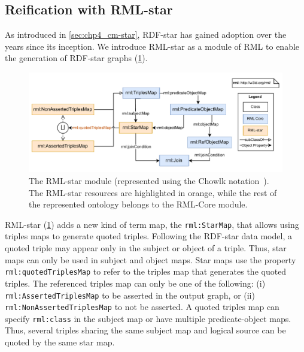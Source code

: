 

\subsection{Reification with RML-star}
\label{sec:chp4_reif_mappings}

As introduced in \cref{sec:chp4_cm-star}, RDF-star has gained adoption over the years since its inception. We introduce RML-star as a module of RML to enable the generation of \mbox{RDF-star} graphs (\cref{fig:chp4-3_rml-star}). 


\begin{figure}[!t]
\centering
\includegraphics[width=1\linewidth]{figures/chp4-3_rml-star_diagram.pdf}
\caption[RML-star module]{The \mbox{RML-star} module (represented using the Chowlk notation~\cite{feria2022chowlk}). The RML-star resources are highlighted in orange, while the rest of the represented ontology belongs to the RML-Core module.}
\label{fig:chp4-3_rml-star}
\end{figure}

\mbox{RML-star} (\cref{fig:chp4-3_rml-star}) adds a new kind of term map, the \texttt{rml:StarMap}, that allows using triples maps to generate quoted triples. 
Following the \mbox{RDF-star} data model,
a quoted triple may appear only in the subject or object of a triple.
Thus, star maps can only be used in subject and object maps.
Star maps use the property \texttt{rml:quotedTriplesMap} to refer to the triples map that generates the quoted triples. 
The referenced triples map can only be one of the following: (i) \texttt{rml:AssertedTriplesMap} to be asserted in the output graph, or (ii) \texttt{rml:NonAssertedTriplesMap} to not be asserted. A quoted triples map can specify \texttt{rml:class} in the subject map or have multiple predicate-object maps.
Thus, several triples sharing the same subject map and logical source can be quoted by the same star map.







